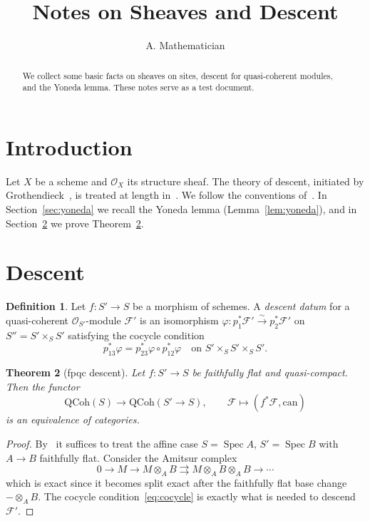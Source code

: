 \documentclass[11pt]{amsart}
\title{Notes on Sheaves and Descent}
\author{A. Mathematician}
\newtheorem{theorem}{Theorem}[section]
\theoremstyle{definition}
\newtheorem{definition}[theorem]{Definition}
\theoremstyle{remark}
\newcommand{\Spec}{\operatorname{Spec}}
\newcommand{\cO}{\mathcal{O}}
\newcommand{\cF}{\mathcal{F}}
\begin{document}
\maketitle

\begin{abstract}
We collect some basic facts on sheaves on sites, descent for quasi-coherent
modules, and the Yoneda lemma. These notes serve as a test document.
\end{abstract}

\tableofcontents

\section{Introduction}\label{sec:intro}
Let $X$ be a scheme and $\cO_X$ its structure sheaf. The theory of descent,
initiated by Grothendieck~\cite{SGA1}, is treated at length in~\cite{Vistoli}.
We follow the conventions of~\cite{Stacks}. In Section~\ref{sec:yoneda} we
recall the Yoneda lemma (Lemma~\ref{lem:yoneda}), and in
Section~\ref{sec:descent} we prove Theorem~\ref{thm:fpqc}.



\section{Descent}\label{sec:descent}
\begin{definition}\label{def:descent-datum}
Let $f\colon S'\to S$ be a morphism of schemes. A \emph{descent datum} for a
quasi-coherent $\cO_{S'}$-module $\cF'$ is an isomorphism
$\varphi\colon p_1^*\cF'\xrightarrow{\sim}p_2^*\cF'$ on $S''=S'\times_S S'$
satisfying the cocycle condition
\begin{equation}\label{eq:cocycle}
p_{13}^*\varphi = p_{23}^*\varphi\circ p_{12}^*\varphi
\quad\text{on } S'\times_S S'\times_S S'.
\end{equation}
\end{definition}

\begin{theorem}[fpqc descent]\label{thm:fpqc}
Let $f\colon S'\to S$ be faithfully flat and quasi-compact. Then the functor
\[
\mathrm{QCoh}(S)\longrightarrow \mathrm{QCoh}(S'\to S),\qquad
\cF\longmapsto (f^*\cF,\mathrm{can})
\]
is an equivalence of categories.
\end{theorem}

\begin{proof}
By~\cite[Tag 023N]{Stacks} it suffices to treat the affine case
$S=\Spec A$, $S'=\Spec B$ with $A\to B$ faithfully flat. Consider the
Amitsur complex
\begin{equation}\label{eq:amitsur}
0\to M\to M\otimes_A B\rightrightarrows M\otimes_A B\otimes_A B
\to\cdots
\end{equation}
which is exact since it becomes split exact after the faithfully flat base
change $-\otimes_A B$. The cocycle condition~\eqref{eq:cocycle} is exactly
what is needed to descend $\cF'$.
\end{proof}
\end{document}
